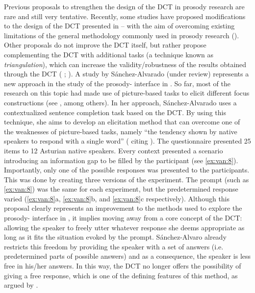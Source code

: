 \documentclass[output=paper]{LSP/langsci}
\begin{document}
Previous proposals to strengthen the design of the DCT in  prosody research are rare and still very tentative. Recently, some studies have proposed modifications to the design of the DCT presented in -- with the aim of overcoming existing limitations of the general methodology commonly used in prosody research (\citealt{ElviraGarcia2017,SanchezAlvarado.2018}). Other pro\-po\-sals do not improve the DCT itself, but rather propose complementing the DCT with additional tasks (a technique known as \textit{triangulation}), which can increase the validity/robustness of the results obtained through the DCT (\citeauthor{Vanrell2014evidentiality} \citeyear*{Vanrell2014evidentiality}; \citealt{Borras-Comes2015}). A study by Sánchez-Alvarado (under review) represents a new approach in the study of the prosody- interface in . So far, most of the research on this topic had made use of picture-based tasks to elicit different focus constructions (see \citealt{Gabriel2007,Muntendam2009,Vanrell2013catalanspanish,Feldhausen2014,FeldhausenVanrell2015}, among others). In her approach, Sánchez-Alvarado uses a contextualized sentence completion task based on the DCT. By using this technique, she aims to develop an elicitation method that can overcome one of the weaknesses of picture-based tasks, namely “the tendency shown by native speakers to respond with a single word” (\citealt{SanchezAlvarado.2018} citing \citealt{Ortega-Llebaria2014}). The questionnaire presented 25 items to 12 Asturian  native speakers. Every context presented a scenario introducing an information gap to be filled by the participant (see \ref{ex:van:8}). Importantly, only one of the possible responses was presented to the par\-ti\-ci\-pants. This was done by creating three versions of the experiment. The prompt (such as \ref{ex:van:8}) was the same for each experiment, but the predetermined response varied (\ref{ex:van:8}a, \ref{ex:van:8}b, and \ref{ex:van:8}c respectively). Although this proposal clearly represents an improvement to the methods used to explore the prosody- interface in , it implies moving away from a core concept of the DCT: allowing the speaker to freely utter whatever response she deems appropriate as long as it fits the situation evoked by the prompt. Sánchez-Alvaro already restricts this freedom by providing the speaker with a set of answers (i.e. predetermined parts of possible answers) and as a consequence, the speaker is less free in his/her answers. In this way, the DCT no longer offers the possibility of giving a free response, which is one of the defining features of this method, as argued by \citet{Kwon2004}. 
 
\end{document}
